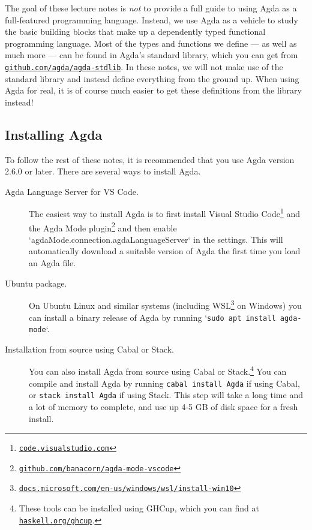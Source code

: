\documentclass[a4paper,UKenglish]{tufte-handout}
\newcommand{\hrefu}[2]{\href{#1}{\nolinkurl{#2}}}
\theoremstyle{definition}
\begin{document}
The goal of these lecture notes is \emph{not} to provide a full guide to using
Agda as a full-featured programming language. Instead, we use Agda as a vehicle
to study the basic building blocks that make up a dependently typed functional
programming language. Most of the types and functions we define --- as well as
much more --- can be found in Agda's standard library, which you can get from
\hrefu{https://github.com/agda/agda-stdlib}{github.com/agda/agda-stdlib}. In
these notes, we will not make use of the standard library and instead define
everything from the ground up. When using Agda for real, it is of course
much easier to get these definitions from the library instead!


\subsection{Installing Agda}

To follow the rest of these notes, it is recommended that you use Agda
version 2.6.0 or later. There are several ways to install Agda.
\begin{description}
  \item[Agda Language Server for VS Code.] The easiest way to install
    Agda is to first install Visual Studio
    Code\footnote{\hrefu{https://code.visualstudio.com/}{code.visualstudio.com}}
    and the Agda Mode
    plugin\footnote{\hrefu{https://github.com/banacorn/agda-mode-vscode}{github.com/banacorn/agda-mode-vscode}}
    and then enable `agdaMode.connection.agdaLanguageServer` in the
    settings. This will automatically download a suitable version of
    Agda the first time you load an Agda file.

  \item[Ubuntu package.] On Ubuntu Linux and similar systems
    (including
    WSL\footnote{\hrefu{https://docs.microsoft.com/en-us/windows/wsl/install-win10}{docs.microsoft.com/en-us/windows/wsl/install-win10}}
    on Windows) you can install a binary release of Agda by running
    `\texttt{sudo apt install agda-mode}`.

  \item[Installation from source using Cabal or Stack.] You can also
    install Agda from source using Cabal or Stack.\footnote{These
    tools can be installed using GHCup, which you can find at
    \hrefu{https://www.haskell.org/ghcup/}{haskell.org/ghcup}.}  You
    can compile and install Agda by running \texttt{cabal install
      Agda} if using Cabal, or \texttt{stack install Agda} if using
    Stack.  This step will take a long time and a lot of memory to
    complete, and use up 4-5 GB of disk space for a fresh install.
\end{description}
\end{document}
